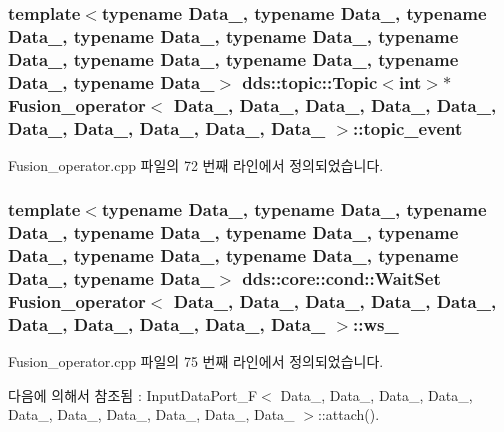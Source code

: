 \subsubsection[{\texorpdfstring{topic\+\_\+event}{topic_event}}]{\setlength{\rightskip}{0pt plus 5cm}template$<$typename Data\+\_, typename Data\+\_, typename Data\+\_, typename Data\+\_, typename Data\+\_, typename Data\+\_, typename Data\+\_, typename Data\+\_, typename Data\+\_, typename Data\+\_$>$ dds\+::topic\+::\+Topic$<$int$>$$\ast$ {\bf Fusion\+\_\+operator}$<$ Data\+\_, Data\+\_, Data\+\_, Data\+\_, Data\+\_, Data\+\_, Data\+\_, Data\+\_, Data\+\_, Data\+\_ $>$\+::topic\+\_\+event}\hypertarget{classFusion__operator_ab2ba1dc33bae5f39ecabd4018bedf47f}{}\label{classFusion__operator_ab2ba1dc33bae5f39ecabd4018bedf47f}


Fusion\+\_\+operator.\+cpp 파일의 72 번째 라인에서 정의되었습니다.

\subsubsection[{\texorpdfstring{ws\+\_\+0}{ws_0}}]{\setlength{\rightskip}{0pt plus 5cm}template$<$typename Data\+\_, typename Data\+\_, typename Data\+\_, typename Data\+\_, typename Data\+\_, typename Data\+\_, typename Data\+\_, typename Data\+\_, typename Data\+\_, typename Data\+\_$>$ dds\+::core\+::cond\+::\+Wait\+Set {\bf Fusion\+\_\+operator}$<$ Data\+\_, Data\+\_, Data\+\_, Data\+\_, Data\+\_, Data\+\_, Data\+\_, Data\+\_, Data\+\_, Data\+\_ $>$\+::ws\+\_}\hypertarget{classFusion__operator_a15a7b6ccddbe0b8ad3bd8932a38c6db2}{}\label{classFusion__operator_a15a7b6ccddbe0b8ad3bd8932a38c6db2}


Fusion\+\_\+operator.\+cpp 파일의 75 번째 라인에서 정의되었습니다.



다음에 의해서 참조됨 \+:  Input\+Data\+Port\+\_\+\+F$<$ Data\+\_, Data\+\_, Data\+\_, Data\+\_, Data\+\_, Data\+\_, Data\+\_, Data\+\_, Data\+\_, Data\+\_ $>$\+::attach().

